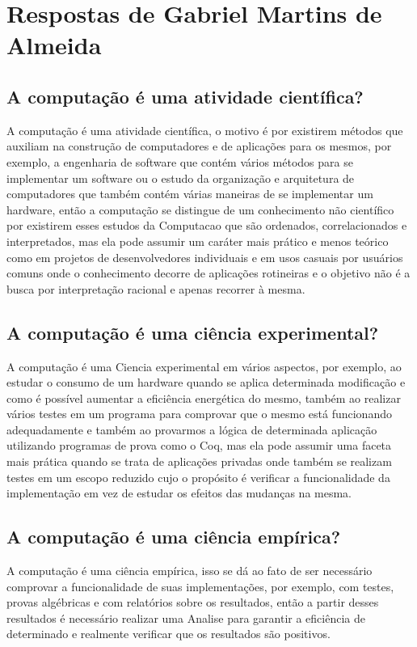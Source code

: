 \section{Respostas de Gabriel Martins de Almeida}

\subsection{A computação é uma atividade científica?}
A computação é uma atividade científica, o motivo é por existirem métodos que auxiliam na construção de computadores e de aplicações para os mesmos, por exemplo, a engenharia de software que contém vários métodos para se implementar um software ou o estudo da organização e arquitetura de computadores que também contém várias maneiras de se implementar um hardware, então a computação se distingue de um conhecimento não científico por existirem esses estudos da \gls{Computacao} que são ordenados, correlacionados e interpretados, mas ela pode assumir um caráter mais prático e menos teórico como em projetos de desenvolvedores individuais e em usos casuais por usuários comuns onde o conhecimento decorre de aplicações rotineiras e o objetivo não é a busca por interpretação racional e apenas recorrer à mesma.

\subsection{A computação é uma ciência experimental?}
A computação é uma  \gls{Ciencia} experimental em vários aspectos, por exemplo, ao estudar o consumo de um hardware quando se aplica determinada modificação e como é possível aumentar a eficiência energética do mesmo, também ao realizar vários testes em um programa para comprovar que o mesmo está funcionando adequadamente e também ao provarmos a lógica de determinada aplicação utilizando programas de prova como o Coq, mas ela pode assumir uma faceta mais prática quando se trata de aplicações privadas onde também se realizam testes em um escopo reduzido cujo o propósito é verificar a funcionalidade da implementação em vez de estudar os efeitos das mudanças na mesma.

\subsection{A computação é uma ciência empírica?}
A computação é uma ciência empírica, isso se dá ao fato de ser necessário comprovar a funcionalidade de suas implementações, por exemplo, com testes, provas algébricas e com relatórios sobre os resultados, então a partir desses resultados é necessário realizar uma \gls{Analise} para garantir a eficiência de determinado e realmente verificar que os resultados são positivos. 